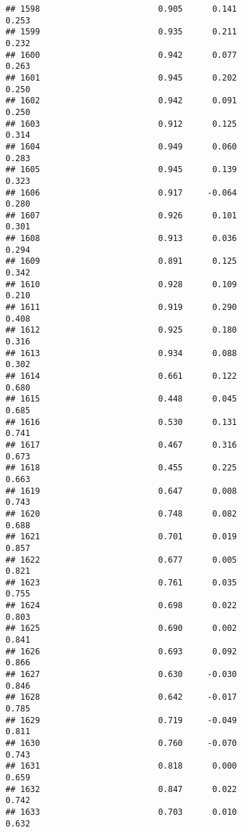 \documentclass[
]{article}
\begin{document}
\begin{verbatim}
## 1598                        0.905      0.141                     0.253
## 1599                        0.935      0.211                     0.232
## 1600                        0.942      0.077                     0.263
## 1601                        0.945      0.202                     0.250
## 1602                        0.942      0.091                     0.250
## 1603                        0.912      0.125                     0.314
## 1604                        0.949      0.060                     0.283
## 1605                        0.945      0.139                     0.323
## 1606                        0.917     -0.064                     0.280
## 1607                        0.926      0.101                     0.301
## 1608                        0.913      0.036                     0.294
## 1609                        0.891      0.125                     0.342
## 1610                        0.928      0.109                     0.210
## 1611                        0.919      0.290                     0.408
## 1612                        0.925      0.180                     0.316
## 1613                        0.934      0.088                     0.302
## 1614                        0.661      0.122                     0.680
## 1615                        0.448      0.045                     0.685
## 1616                        0.530      0.131                     0.741
## 1617                        0.467      0.316                     0.673
## 1618                        0.455      0.225                     0.663
## 1619                        0.647      0.008                     0.743
## 1620                        0.748      0.082                     0.688
## 1621                        0.701      0.019                     0.857
## 1622                        0.677      0.005                     0.821
## 1623                        0.761      0.035                     0.755
## 1624                        0.698      0.022                     0.803
## 1625                        0.690      0.002                     0.841
## 1626                        0.693      0.092                     0.866
## 1627                        0.630     -0.030                     0.846
## 1628                        0.642     -0.017                     0.785
## 1629                        0.719     -0.049                     0.811
## 1630                        0.760     -0.070                     0.743
## 1631                        0.818      0.000                     0.659
## 1632                        0.847      0.022                     0.742
## 1633                        0.703      0.010                     0.632

\end{verbatim}
\end{document}
